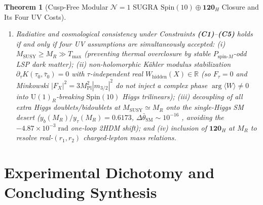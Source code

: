 \documentclass[11pt,a4paper]{article}
\newtheorem{theorem}{Theorem}[section]
\begin{document}
\begin{theorem}[Cusp-Free Modular $\mathcal{N}=1$ SUGRA $\mathrm{Spin}(10)\oplus\mathbf{120}_H$ Closure and Its Four UV Costs]
\begin{enumerate}[label=(\arabic*),leftmargin=1.8em,itemsep=2pt]
\item Radiative and cosmological consistency under Constraints \textbf{(C1)}--\textbf{(C5)} holds \emph{if and only if} four UV assumptions are simultaneously accepted: (i) $M_{\mathrm{SUSY}} \ge M_R \gg T_{\max}$ (preventing thermal overclosure by stable $P_{\mathrm{spin}\text{-}M}$-odd LSP dark matter); (ii) non-holomorphic K\"ahler modulus stabilization $\partial_\tau K(\tau_0,\bar{\tau}_0) = 0$ with $\tau$-independent real $W_{\mathrm{hidden}}(X) \in \mathbb{R}$ (so $F_\tau = 0$ and Minkowski $|F_X|^2 = 3 M_{\mathrm{Pl}}^2|m_{3/2}|^2$ do not inject a complex phase $\arg\langle W\rangle \neq 0$ into $\mathrm{U}(1)_R$-breaking $\mathrm{Spin}(10)$ Higgs trilinears); (iii) decoupling of all extra Higgs doublets/bidoublets at $M_{\mathrm{SUSY}} \simeq M_R$ onto the single-Higgs SM desert ($y_b(M_R)/y_\tau(M_R) = 0.6173$, $\Delta\bar{\theta}_{\mathrm{SM}} \sim 10^{-16}$ \cite{EllisGaillard1979}, avoiding the $-4.87\times 10^{-3}\;\mathrm{rad}$ one-loop 2HDM shift); and (iv) inclusion of $\mathbf{120}_H$ at $M_R$ to resolve real-$(r_1,r_2)$ charged-lepton mass relations.
\end{enumerate}
\end{theorem}

\section{Experimental Dichotomy and Concluding Synthesis}
\label{sec:conclusion}
\end{document}
